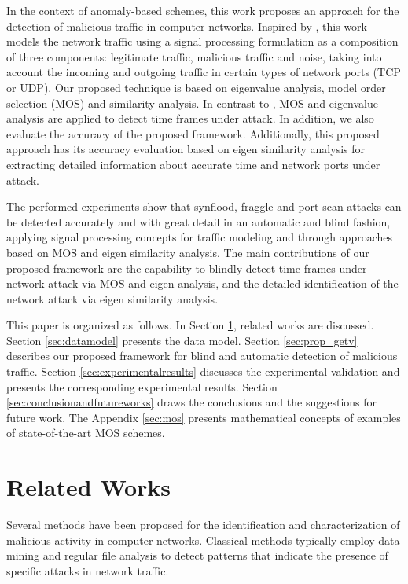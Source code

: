 \documentclass{bmcart}
\begin{document}
In the context of anomaly-based schemes, this work proposes an approach for the detection of malicious traffic in computer networks. Inspired by \cite{david2011blind,da2012improved}, this work models the network traffic using a signal processing formulation as a composition of three components: legitimate traffic, malicious traffic and noise, taking into account the incoming and outgoing traffic in certain types of network ports (TCP or UDP). Our proposed technique is based on eigenvalue analysis, model order selection (MOS) and similarity analysis. In contrast to \cite{david2011blind,da2012improved,tenorio2013greatest}, MOS and eigenvalue analysis are applied to detect time frames under attack. In addition, we also evaluate the accuracy of the proposed framework. Additionally, this proposed approach has its accuracy evaluation based on eigen similarity analysis for extracting detailed information about accurate time and network ports under attack. 

The performed experiments show that synflood, fraggle and port scan attacks can be detected accurately and with great detail in an automatic and blind fashion, applying signal processing concepts for traffic modeling and through approaches based on MOS and eigen similarity analysis. The main contributions of our proposed framework are the capability to blindly detect time frames under network attack via MOS and eigen analysis, and the detailed identification of the network attack via eigen similarity analysis.

This paper is organized as follows. In Section \ref{sec:relatedworks}, related works are discussed. Section \ref{sec:datamodel} presents the data model. Section \ref{sec:prop_getv} describes our proposed framework for blind and automatic detection of malicious traffic. Section \ref{sec:experimentalresults} discusses the experimental validation and presents the corresponding experimental results. Section \ref{sec:conclusionandfutureworks} draws the conclusions and the suggestions for future work. The Appendix \ref{sec:mos} presents mathematical concepts of examples of state-of-the-art MOS schemes.


\section{Related Works}
\label{sec:relatedworks}

Several methods have been proposed for the identification and characterization of malicious activity in computer networks. Classical methods typically employ data mining \cite{he2008applying,ghourabi2010data} and regular file analysis \cite{raynal2004honeypot} to detect patterns that indicate the presence of specific attacks in network traffic.
\end{document}
